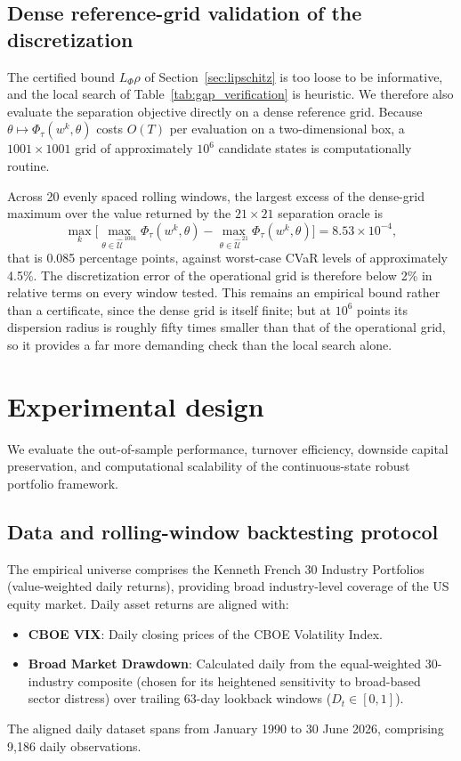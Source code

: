 \documentclass[smallextended]{svjour3}
\begin{document}
\subsection{Dense reference-grid validation of the discretization}
\label{sec:dense_grid}
The certified bound $L_\Phi \rho$ of Section~\ref{sec:lipschitz} is too loose
to be informative, and the local search of Table~\ref{tab:gap_verification} is
heuristic. We therefore also evaluate the separation objective directly on a
dense reference grid. Because $\theta \mapsto \Phi_\tau(w^k,\theta)$ costs
$O(T)$ per evaluation on a two-dimensional box, a $1001 \times 1001$ grid of
approximately $10^6$ candidate states is computationally routine.

Across 20 evenly spaced rolling windows, the largest excess of the dense-grid
maximum over the value returned by the $21\times21$ separation oracle is
\[
\max_k \Big[ \max_{\theta \in \widehat{\mathcal{U}}^{\,1001}} \Phi_\tau(w^k,\theta)
      - \max_{\theta \in \widehat{\mathcal{U}}^{\,21}} \Phi_\tau(w^k,\theta) \Big]
= 8.53 \times 10^{-4},
\]
that is 0.085 percentage points, against worst-case CVaR levels of
approximately 4.5\%. The discretization error of the operational grid is
therefore below 2\% in relative terms on every window tested. This remains an
empirical bound rather than a certificate, since the dense grid is itself
finite; but at $10^6$ points its dispersion radius is roughly fifty times
smaller than that of the operational grid, so it provides a far more
demanding check than the local search alone.

\section{Experimental design}\label{sec:experimental}
We evaluate the out-of-sample performance, turnover efficiency, downside capital preservation, and computational scalability of the continuous-state robust portfolio framework.

\subsection{Data and rolling-window backtesting protocol}
The empirical universe comprises the Kenneth French 30 Industry Portfolios \cite{french2026data} (value-weighted daily returns), providing broad industry-level coverage of the US equity market. Daily asset returns are aligned with:
\begin{itemize}
    \item \textbf{CBOE VIX}: Daily closing prices of the CBOE Volatility Index.
    \item \textbf{Broad Market Drawdown}: Calculated daily from the equal-weighted 30-industry composite (chosen for its heightened sensitivity to broad-based sector distress) over trailing 63-day lookback windows ($D_t \in [0, 1]$).
\end{itemize}
The aligned daily dataset spans from January 1990 to 30 June 2026, comprising 9,186 daily observations.
\end{document}
